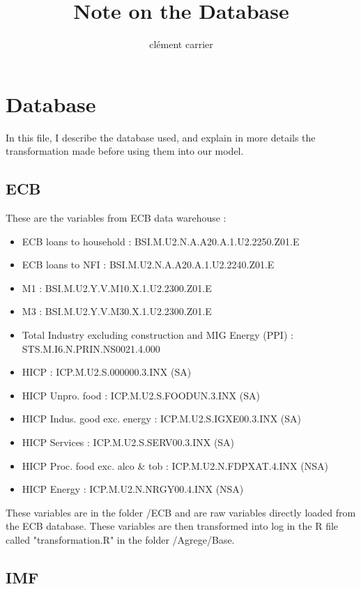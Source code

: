 \documentclass[11pt,a4paper]{article}
\title{Note on the Database}
\author{clément carrier}
\begin{document}
\maketitle

\section{Database}

In this file, I describe the database used, and explain in more details the transformation made before using them into our model. 

\subsection{ECB}

These are the variables from ECB data warehouse :
\begin{itemize}
\item ECB loans to household : BSI.M.U2.N.A.A20.A.1.U2.2250.Z01.E
\item ECB loans to NFI : BSI.M.U2.N.A.A20.A.1.U2.2240.Z01.E
\item M1 : BSI.M.U2.Y.V.M10.X.1.U2.2300.Z01.E
\item M3 : BSI.M.U2.Y.V.M30.X.1.U2.2300.Z01.E
\item Total Industry excluding construction and MIG Energy (PPI) : STS.M.I6.N.PRIN.NS0021.4.000
\item HICP : ICP.M.U2.S.000000.3.INX (SA)
\item HICP Unpro. food : ICP.M.U2.S.FOODUN.3.INX (SA)
\item HICP Indus. good exc. energy : ICP.M.U2.S.IGXE00.3.INX (SA)
\item HICP Services : ICP.M.U2.S.SERV00.3.INX (SA)
\item HICP Proc. food exc. alco \& tob : ICP.M.U2.N.FDPXAT.4.INX (NSA)
\item HICP Energy : ICP.M.U2.N.NRGY00.4.INX (NSA)
\end{itemize}

\vspace{0.5cm}

These variables are in the folder /ECB and are raw variables directly loaded from the ECB database. These variables are then transformed into log in the R file called "transformation.R" in the folder /Agrege/Base. 

\subsection{IMF}
\end{document}
